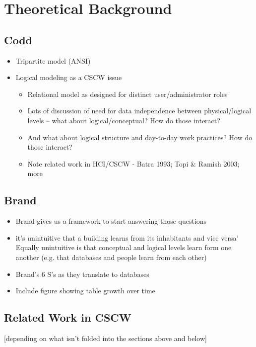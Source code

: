 \section{Theoretical Background}

\subsection{Codd}
\begin{itemize}
\item Tripartite model (ANSI)
\item Logical modeling as a CSCW issue
\begin{itemize}
\item Relational model as designed for distinct user/administrator roles
\item Lots of discussion of need for data independence between physical/logical levels – what about logical/conceptual? How do those interact?
\item And what about logical structure and day-to-day work practices? How do those interact?
\item Note related work in HCI/CSCW - Batra 1993; Topi & Ramish 2003; more
\end{itemize}
\end{itemize}


\subsection{Brand}

\begin{itemize}
\item Brand gives us a framework to start answering those questions
\item	it's unintuitive that a building learns from its inhabitants and vice versa’ Equally unintuitive is that conceptual and logical levels learn form one another (e.g. that databases and people learn from each other)
\item Brand’s 6 S’s as they translate to databases
\item Include figure showing table growth over time
\end{itemize}

\subsection{Related Work in CSCW}

[depending on what isn't folded into the sections above and below]


